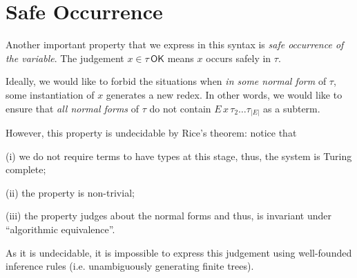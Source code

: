 \documentclass[a4,natbib=false]{article}
\newcommand{\bnfalt}{\;\;|\;\;}
\newcommand{\fun}[2]{\lambda {#1}.\,{#2}}
\newcommand{\letname}{\mathsf{let}}
\newcommand{\dletname}{\mathsf{dlet}}
\newcommand{\letval}[3]{\letname\; {#1} \,:=\, {#2} \;\mathsf{in}\; {#3}}
\newcommand{\dletval}[3]{\dletname\; {#1} \,:=\, {#2} \;\mathsf{in}\; {#3}}
\newcommand{\pair}[2]{\left\langle{#1}, {#2}\right\rangle}
\newcommand{\comptoval}[1]{\downarrow \hspace{-2pt} #1}
\newcommand{\valtocomp}[1]{\uparrow \hspace{-2pt} #1}
\newcommand{\sigmatype}[2]{\Sigma {#1}.\,#2}
\newcommand{\pitype}[2]{\Pi {#1}.\,#2}
\newcommand{\foralltype}[2]{\forall {#1}.\,#2}
\newcommand{\eqtype}[3]{\mathsf{eq}{#1}\,{#2}\,{#3}}
\newcommand{\refl}{\mathsf{refl}}
\newcommand{\force}[1]{\mathsf{force}\,{#1}}
\newcommand{\return}[1]{\mathsf{return}\,{#1}}
\newcommand{\thunk}[1]{\{{#1}\}}
\newcommand{\recsigmaname}{\mathsf{rec}_{\Sigma}}
\newcommand{\recsigma}[3]{\recsigmaname^{#2}({#1},{#3})}
\newcommand{\receqname}{\mathsf{rec}_{\mathsf{eq}}}
\newcommand{\receq}[3]{\receqname^{#2}({#1},{#3})}
\newcommand{\narg}[1]{|{#1}|}
\newcommand{\judgeSok}[2]{{#1} \in {#2}\,\mathsf{OK}}
\begin{document}






\section{Safe Occurrence}

Another important property that we express in this syntax is \emph{safe
  occurrence of the variable}. The judgement $\judgeSok{x}{\tau}$ means $x$
occurs safely in $\tau$.

Ideally, we would like to forbid the situations when \emph{in some normal form}
of $\tau$, some instantiation of $x$ generates a new redex. In other words, we
would like to ensure that
\emph{all normal forms} of $\tau$ do not contain $E \, x \, \tau_2 \dots
\tau_{\narg{E}}$ as a subterm.

However, this property is undecidable by Rice's theorem: notice that
\begin{enumerate*}

\item[(i)] we do not require terms to have types at this stage, thus, the
  system is Turing complete;

\item[(ii)] the property is non-trivial;

\item[(iii)] the property judges about the normal forms and thus, is invariant
  under ``algorithmic equivalence''.
\end{enumerate*}
As it is undecidable, it is impossible to express this judgement using
well-founded inference rules (i.e. unambiguously generating finite trees).
\end{document}
